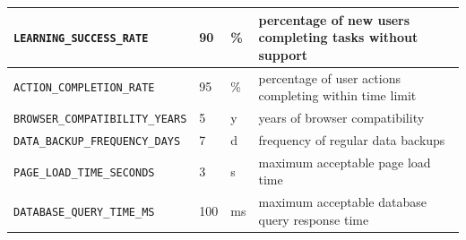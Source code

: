 \documentclass[12pt, titlepage]{article}
\begin{document}
\begin{longtable}{|l|l|l|p{5cm}|}
    \texttt{LEARNING\_SUCCESS\_RATE}\label{LEARNING_SUCCESS_RATE} & 90 & \% & percentage of new users completing tasks without support \\ \hline
    \texttt{ACTION\_COMPLETION\_RATE}\label{ACTION_COMPLETION_RATE} & 95 & \% & percentage of user actions completing within time limit \\ \hline
    \texttt{BROWSER\_COMPATIBILITY\_YEARS}\label{BROWSER_COMPATIBILITY_YEARS} & 5 & y & years of browser compatibility \\ \hline
    \texttt{DATA\_BACKUP\_FREQUENCY\_DAYS}\label{DATA_BACKUP_FREQUENCY_DAYS} & 7 & d & frequency of regular data backups \\ \hline
    \texttt{PAGE\_LOAD\_TIME\_SECONDS}\label{PAGE_LOAD_TIME_SECONDS} & 3 & s & maximum acceptable page load time \\ \hline
    \texttt{DATABASE\_QUERY\_TIME\_MS}\label{DATABASE_QUERY_TIME_MS} & 100 & ms & maximum acceptable database query response time \\ \hline
\end{longtable}
\end{document}
